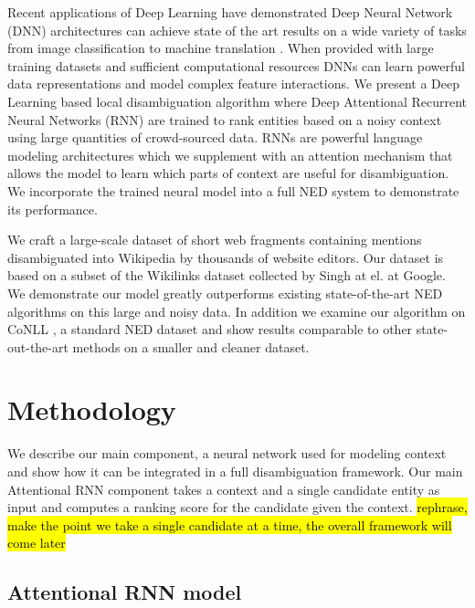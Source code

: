 \documentclass[11pt]{article}
\begin{document}
Recent applications of Deep Learning have demonstrated Deep Neural Network (DNN) architectures can achieve state of the art results on a wide variety of tasks from image classification \cite{krizhevsky2012imagenet} to machine translation \cite{bahdanau2014neural}. When provided with large training datasets and sufficient computational resources DNNs can learn powerful data representations and model complex feature interactions. We present a Deep Learning based local disambiguation algorithm where Deep Attentional Recurrent Neural Networks (RNN) are trained to rank entities based on a noisy context using large quantities of crowd-sourced data. RNNs are powerful language modeling architectures which we supplement with an attention mechanism that allows the model to learn which parts of context are useful for disambiguation. We incorporate the trained neural model into a full NED system to demonstrate its performance.

We craft a large-scale dataset of short web fragments containing mentions disambiguated into Wikipedia by thousands of website editors. Our dataset is based on a subset of the Wikilinks dataset \cite{singh12:wiki-links} collected by Singh at el. at Google. We demonstrate our model greatly outperforms existing state-of-the-art NED algorithms on this large and noisy data. In addition we examine our algorithm on CoNLL \cite{hoffart2011robust}, a standard NED dataset and show results comparable to other state-out-the-art methods on a smaller and cleaner dataset.

\section{Methodology}

We describe our main component, a neural network used for modeling context and show how it can be integrated in a full disambiguation framework. Our main Attentional RNN component takes a context and a single candidate entity as input and computes a ranking score for the candidate given the context. \hl{rephrase, make the point we take a single candidate at a time, the overall framework will come later}

\subsection{Attentional RNN model}
\end{document}
